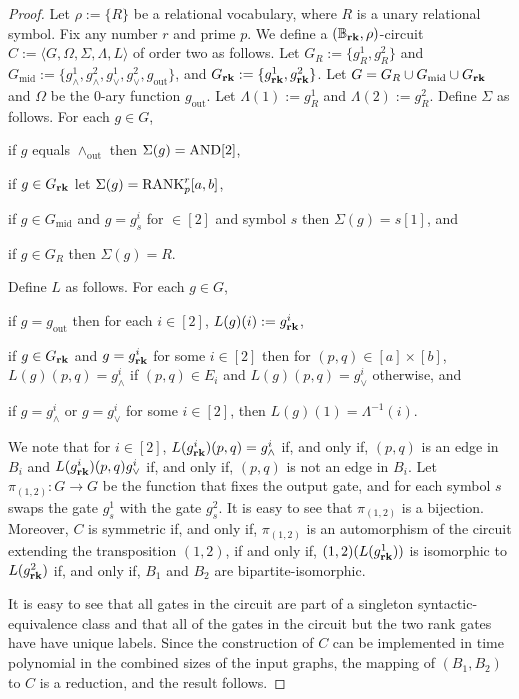 \documentclass[../main/thesis.tex]{subfiles}
\begin{document}
\begin{proof}
  Let $\rho:= \{R\}$ be a relational vocabulary, where $R$ is a unary relational
  symbol. Fix any number $r$ and prime $p$. We define a $(\mathbb{B}_{\text{\textbf{rk}}}, \rho)$-circuit $C
  := \langle G, \Omega, \Sigma, \Lambda, L \rangle$ of order two as follows. Let
  $G_{R} := \{g^1_{R}, g^2_{R}\}$ and $G_{\text{mid}} := \{g^1_{\land},
  g^2_\land, g^1_\lor, g^2_\lor , g_{\text{out}}\}$, and $G_{\text{\textbf{rk}}} : = \{
  g^1_{\text{\textbf{rk}}}, g^2_{\text{\textbf{rk}}}\}$. Let $G = G_R \cup G_{\text{mid}} \cup G_{\text{\textbf{rk}}}$
  and $\Omega$ be the $0$-ary function $g_{\text{out}}$. Let $\Lambda(1) :=
  g^1_{R}$ and $\Lambda(2) := g^2_{R}$. Define $\Sigma$ as follows. For each $g
  \in G$,
  \begin{myitemize}
  \item if $g$ equals $\land_{\text{out}}$ then $\Sigma(g) = \text{\upshape AND}[2]$,
  \item if $g \in G_{\text{\textbf{rk}}}$ let $\Sigma(g) = \text{\upshape RANK}^r_p [a,b]$,
  \item if $g \in G_{\text{mid}}$ and $g = g^i_s$ for $ \in [2]$ and symbol $s$
    then $\Sigma(g) = s[1]$, and
  \item if $g \in G_R$ then $\Sigma(g) = R$.
  \end{myitemize}
  Define $L$ as follows. For each $g \in G$,
  \begin{myitemize}
  \item if $g = g_{\text{out}}$ then for each $i \in [2]$, $L(g)(i) :=
    g^i_{\text{\textbf{rk}}}$,
  \item if $g \in G_{\text{\textbf{rk}}}$ and $g = g^i_{\text{\textbf{rk}}}$ for some $i \in [2]$ then for
    $(p,q) \in [a]\times [b]$, $L(g)(p,q) = g^i_\land$ if $(p,q) \in E_i$ and
    $L(g)(p,q) = g^i_\lor$ otherwise, and
  \item if $g = g^i_\land$ or $g = g^i_{\lor}$ for some $i \in [2]$, then
    $L(g)(1) = \Lambda^{-1}(i)$.
  \end{myitemize}

  We note that for $i \in [2]$, $L(g^i_{\text{\textbf{rk}}})(p,q)= g^i_\land$ if, and only
  if, $(p,q)$ is an edge in $B_i$ and $L(g^i_{\text{\textbf{rk}}})(p,q) g^i_\lor$ if, and
  only if, $(p,q)$ is not an edge in $B_i$. Let $\pi_{(1,2)} : G \rightarrow G$
  be the function that fixes the output gate, and for each symbol $s$ swaps the
  gate $g^1_s$ with the gate $g^2_s$. It is easy to see that $\pi_{(1,2)}$ is a
  bijection. Moreover, $C$ is symmetric if, and only if, $\pi_{(1,2)}$ is an
  automorphism of the circuit extending the transposition $(1,2)$, if and only
  if, $(1,2) (L(g^1_{\text{\textbf{rk}}}))$ is isomorphic to $L(g^2_{\text{\textbf{rk}}})$ if, and only
  if, $B_1$ and $B_2$ are bipartite-isomorphic.
 
  It is easy to see that all gates in the circuit are part of a singleton
  syntactic-equivalence class and that all of the gates in the circuit but the
  two rank gates have have unique labels. Since the construction of $C$ can be
  implemented in time polynomial in the combined sizes of the input graphs, the
  mapping of $(B_1, B_2)$ to $C$ is a reduction, and the result follows.
\end{proof}
\end{document}
